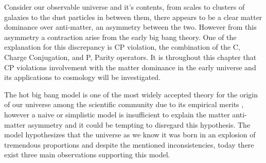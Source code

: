 Consider our observable universe and it's contents, from scales to clusters of galaxies to the dust particles in between them, there appears to be a clear matter dominance over anti-matter, an asymmetry between the two. However from this asymmetry a contraction arise from the early big bang theory. One of the  explanation for this discrepancy is CP violation, the combination of the C, Charge Conjugation, and P, Parity operators. It is throughout this chapter that CP violations involvement with the matter dominance in the early universe and its applications to cosmology will be investigated. \\
\par The hot big bang model is one of the most widely accepted theory for the origin of our universe among the scientific community due to its empirical merits \cite{1}\cite{10}, however a naive or simplistic model is insufficient to explain the matter anti-matter asymmetry and it could be tempting to disregard this hypothesis. The model hypothesizes that the universe as we know it was born in an explosion of tremendous proportions and despite the mentioned inconsistencies, today there exist three main observations supporting this model.\cite{10} \\
